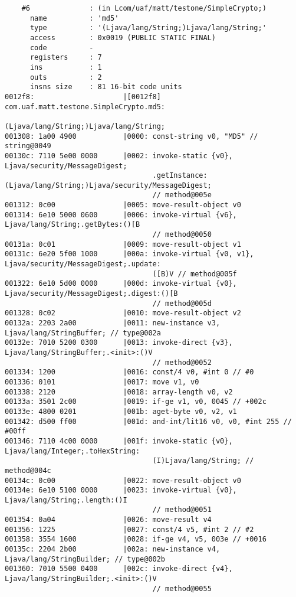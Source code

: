 \begin{lstlisting}
    #6              : (in Lcom/uaf/matt/testone/SimpleCrypto;)
      name          : 'md5'
      type          : '(Ljava/lang/String;)Ljava/lang/String;'
      access        : 0x0019 (PUBLIC STATIC FINAL)
      code          -
      registers     : 7
      ins           : 1
      outs          : 2
      insns size    : 81 16-bit code units
0012f8:                     |[0012f8] com.uaf.matt.testone.SimpleCrypto.md5:
                                      (Ljava/lang/String;)Ljava/lang/String;
001308: 1a00 4900           |0000: const-string v0, "MD5" // string@0049
00130c: 7110 5e00 0000      |0002: invoke-static {v0}, Ljava/security/MessageDigest;
                                   .getInstance:(Ljava/lang/String;)Ljava/security/MessageDigest;
                                   // method@005e
001312: 0c00                |0005: move-result-object v0
001314: 6e10 5000 0600      |0006: invoke-virtual {v6}, Ljava/lang/String;.getBytes:()[B
                                   // method@0050
00131a: 0c01                |0009: move-result-object v1
00131c: 6e20 5f00 1000      |000a: invoke-virtual {v0, v1}, Ljava/security/MessageDigest;.update:
                                   ([B)V // method@005f
001322: 6e10 5d00 0000      |000d: invoke-virtual {v0}, Ljava/security/MessageDigest;.digest:()[B
                                   // method@005d
001328: 0c02                |0010: move-result-object v2
00132a: 2203 2a00           |0011: new-instance v3, Ljava/lang/StringBuffer; // type@002a
00132e: 7010 5200 0300      |0013: invoke-direct {v3}, Ljava/lang/StringBuffer;.<init>:()V
                                   // method@0052
001334: 1200                |0016: const/4 v0, #int 0 // #0
001336: 0101                |0017: move v1, v0
001338: 2120                |0018: array-length v0, v2
00133a: 3501 2c00           |0019: if-ge v1, v0, 0045 // +002c
00133e: 4800 0201           |001b: aget-byte v0, v2, v1
001342: d500 ff00           |001d: and-int/lit16 v0, v0, #int 255 // #00ff
001346: 7110 4c00 0000      |001f: invoke-static {v0}, Ljava/lang/Integer;.toHexString:
                                   (I)Ljava/lang/String; // method@004c
00134c: 0c00                |0022: move-result-object v0
00134e: 6e10 5100 0000      |0023: invoke-virtual {v0}, Ljava/lang/String;.length:()I
                                   // method@0051
001354: 0a04                |0026: move-result v4
001356: 1225                |0027: const/4 v5, #int 2 // #2
001358: 3554 1600           |0028: if-ge v4, v5, 003e // +0016
00135c: 2204 2b00           |002a: new-instance v4, Ljava/lang/StringBuilder; // type@002b
001360: 7010 5500 0400      |002c: invoke-direct {v4}, Ljava/lang/StringBuilder;.<init>:()V
                                   // method@0055






\end{lstlisting}
